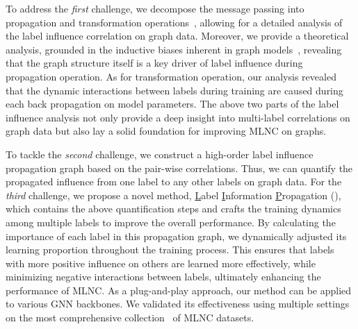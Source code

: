 
To address the \emph{first} challenge,
we decompose the message passing into propagation and transformation operations~\citep{zhang2022model}, allowing for a detailed analysis of the label influence correlation on graph data. 
Moreover, we provide a theoretical analysis, grounded in the inductive biases inherent in graph models~\citep{xu2018representation,wang2020unifying}, revealing that the graph structure itself is a key driver of label influence during propagation operation. 
As for transformation operation, our analysis revealed that the dynamic interactions between labels during training are caused during each back propagation on model parameters. 
The above two parts of the label influence analysis not only provide a deep insight into multi-label correlations on graph data but also lay a solid foundation for improving MLNC on graphs. 

To tackle the \emph{second} challenge, we construct a high-order label influence propagation graph based on the pair-wise correlations. Thus, we can quantify the propagated influence from one label to any other labels on graph data.
For the \emph{third} challenge, we propose a novel method, \underline{L}abel \underline{I}nformation \underline{P}ropagation (\model), which contains the above quantification steps and crafts the training dynamics among multiple labels to improve the overall performance.
By calculating the importance of each label in this propagation graph, we dynamically adjusted its learning proportion throughout the training process. This ensures that labels with more positive influence on others are learned more effectively, while minimizing negative interactions between labels, ultimately enhancing the performance of MLNC.
As a plug-and-play approach, our method can be applied to various GNN backbones. We validated its effectiveness using multiple settings on the most comprehensive collection~\citep{zhao2023multi} of MLNC datasets.


